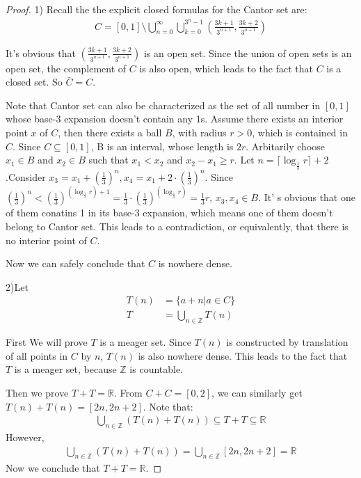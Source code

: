 \documentclass[a4paper, linespread=1.5]{article}
\begin{document}
	\begin{proof}
		1) Recall the the explicit closed formulas for the Cantor set are:
		\begin{align*}
			C= [0,1]\setminus \bigcup\limits_{n=0}^\infty \bigcup\limits_{k=0}^{3^n-1}(\frac{3k+1}{3^{n+1}},\frac{3k+2}{3^{n+1}})
		\end{align*}
		
		It's obvious that $(\frac{3k+1}{3^{n+1}},\frac{3k+2}{3^{n+1}})$ is an open set. Since the union of open sets is an open set, the complement of $C$ is also open, which leads to the fact that $C$ is a closed set. So $\bar{C}=C$.
		
		Note that Cantor set can also be characterized as the set of all number in $[0,1]$ whose base-3 expansion doesn't contain any 1s. Assume there exists an interior point $x$ of $C$, then 
		there exists a ball $B$, with radius $r > 0$, which is contained in $C$. Since $C \subseteq [0,1]$, B is an interval, whose length is $2r$. Arbitarily choose $x_1 \in B$ and $x_2\in B$ such that $x_1<x_2$ and $x_2-x_1\ge r$. Let $n=\lceil\log_{\frac{1}{3}}r\rceil+2$.Consider $x_3=x_1+(\frac{1}{3})^n,x_4=x_1+2\cdot(\frac{1}{3})^n$. Since $(\frac{1}{3})^n<(\frac{1}{3})^{(\log_\frac{1}{3}r) +1}=\frac{1}{3}\cdot(\frac{1}{3})^{(\log_\frac{1}{3}r)}=\frac{1}{3}r$, $x_3,x_4\in B$.  It' s obvious that one of them conatins 1 in its base-3 expansion, which means one of them doesn't belong to Cantor set. This leads to a contradiction, or equivalently, that there is no interior point of $C$.
		
		Now we can safely conclude that $C$ is nowhere dense.
		
		2)Let 
		\begin{align*}
			T(n)&=\{a+n| a\in C\}\\ T&=\bigcup\limits_{n\in \mathbb{Z}}T(n)
		\end{align*}
		
		
		First We will prove $T$ is a meager set. Since $T(n)$ is constructed by translation of all points in $C$ by $n$, $T(n)$ is also nowhere dense. This leads to the fact that $T$ is a meager set, because $\mathbb{Z}$ is countable. 
		
		Then we prove $T+T=\mathbb{R}$. From $C+C=[0,2]$, we can similarly get $T(n)+T(n)=[2n,2n+2]$. Note that:
		\begin{align*}
			\bigcup\limits_{n\in\mathbb{Z}}(T(n)+T(n))\subseteq T+T \subseteq \mathbb{R}
		\end{align*} 
		However,
		\begin{align*}
			\bigcup\limits_{n\in\mathbb{Z}}(T(n)+T(n))=\bigcup\limits_{n\in\mathbb{Z}}[2n,2n+2]=\mathbb{R}
		\end{align*}
		Now we conclude that $T+T=\mathbb{R}$.
		

\end{proof}
\end{document}
